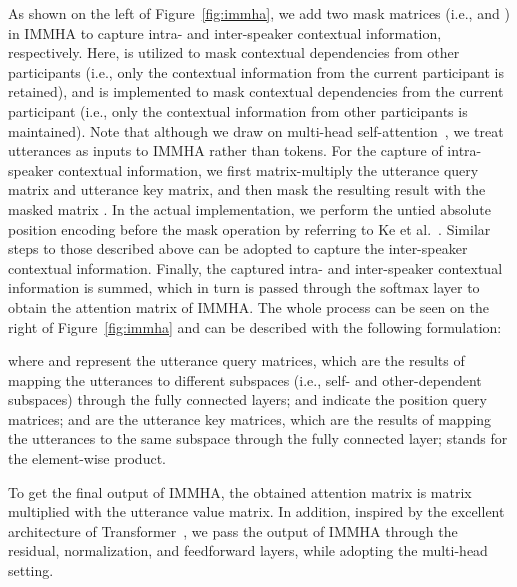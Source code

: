 \documentclass{SCIS2019}
\begin{document}
As shown on the left of Figure~\ref{fig:immha}, we add two mask matrices (i.e.,  and ) in IMMHA to capture intra- and inter-speaker contextual information, respectively. Here,  is utilized to mask contextual dependencies from other participants (i.e., only the contextual information from the current participant is retained), and  is implemented to mask contextual dependencies from the current participant (i.e., only the contextual information from other participants is maintained). Note that although we draw on multi-head self-attention~\cite{vaswani2017attention}, we treat utterances as inputs to IMMHA rather than tokens. For the capture of intra-speaker contextual information, we first matrix-multiply the utterance query matrix and utterance key matrix, and then mask the resulting result with the masked matrix . In the actual implementation, we perform the untied absolute position encoding before the mask operation by referring to Ke et al.~\cite{KeG2020rethink}. Similar steps to those described above can be adopted to capture the inter-speaker contextual information. 
Finally, the captured intra- and inter-speaker contextual information is summed, which in turn is passed through the softmax layer to obtain the attention matrix of IMMHA. The whole process can be seen on the right of Figure~\ref{fig:immha} and can be described with the following formulation:

where  and  represent the utterance query matrices, which are the results of mapping the utterances to different subspaces (i.e., self- and other-dependent subspaces) through the fully connected layers;  and  indicate the position query matrices;  and  are the utterance key matrices, which are the results of mapping the utterances to the same subspace through the fully connected layer;  stands for the element-wise product.

To get the final output of IMMHA, the obtained attention matrix  is matrix multiplied with the utterance value matrix. In addition, inspired by the excellent architecture of Transformer~\cite{vaswani2017attention}, we pass the output of IMMHA through the residual, normalization, and feedforward layers, while adopting the multi-head setting.
\end{document}
